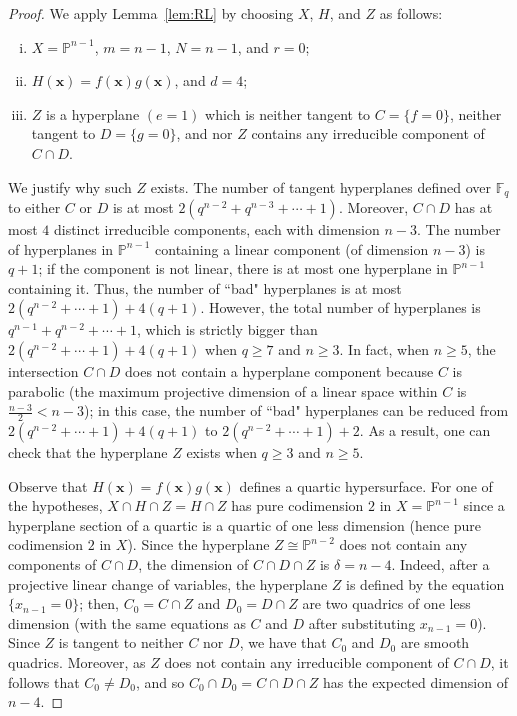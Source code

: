 \documentclass[10pt,a4paper]{amsart}
\begin{document}
\begin{proof} We apply Lemma~\ref{lem:RL} by choosing $X$, $H$, and $Z$ as follows:
\begin{enumerate}[(i)]
\item $X=\mathbb{P}^{n-1}$, $m=n-1$, $N=n-1$, and $r=0$;
\item $H(\mathbf{x})=f(\mathbf{x})g(\mathbf{x})$, and $d=4$;
\item $Z$ is a hyperplane $(e=1)$ which is neither tangent to $C=\{f=0\}$, neither tangent to $D=\{g=0\}$, and nor $Z$ contains any irreducible component of $C\cap D$. 
\end{enumerate}   
We justify why such $Z$ exists. The number of tangent hyperplanes defined over $\mathbb{F}_q$ to either $C$ or $D$ is at most $2(q^{n-2}+q^{n-3}+\cdots+1)$. Moreover, $C\cap D$ has at most $4$ distinct irreducible components, each with dimension $n-3$. The number of hyperplanes in $\mathbb{P}^{n-1}$ containing a linear component (of dimension $n-3$) is $q+1$; if the component is not linear, there is at most one hyperplane in $\mathbb{P}^{n-1}$ containing it. Thus, the number of ``bad" hyperplanes is at most $2(q^{n-2}+\cdots + 1) + 4(q+1)$. However, the total number of hyperplanes is $q^{n-1}+q^{n-2}+\cdots+1$, which is strictly bigger than $2(q^{n-2}+\cdots + 1) + 4(q+1)$ when $q\geq 7$ and $n \geq 3$. In fact, when $n\geq 5$, the intersection $C\cap D$ does not contain a hyperplane component because $C$ is parabolic (the maximum projective dimension of a linear space within $C$ is $\frac{n-3}{2}<n-3$); in this case, the number of ``bad" hyperplanes can be reduced from $2(q^{n-2}+\cdots + 1) + 4(q+1)$ to $2(q^{n-2}+\cdots + 1) + 2$. As a result, one can check that the hyperplane $Z$ exists when $q\geq 3$ and $n\geq 5$.

Observe that $H(\mathbf{x})=f(\mathbf{x})g(\mathbf{x})$ defines a quartic hypersurface. For one of the hypotheses, $X\cap H\cap Z = H\cap Z$ has pure codimension $2$ in $X=\mathbb{P}^{n-1}$ since a hyperplane section of a quartic is a quartic of one less dimension (hence pure codimension $2$ in $X$). Since the hyperplane $Z\cong\mathbb{P}^{n-2}$ does not contain any components of $C\cap D$, the dimension of $C\cap D\cap Z$ is $\delta = n-4$. Indeed, after a projective linear change of variables, the hyperplane $Z$ is defined by the equation $\{x_{n-1}=0\}$; then, $C_0 = C\cap Z$ and $D_0 = D\cap Z$ are two quadrics of one less dimension (with the same equations as $C$ and $D$ after substituting $x_{n-1}=0$). Since $Z$ is tangent to neither $C$ nor $D$, we have that $C_0$ and $D_0$ are smooth quadrics. Moreover, as $Z$ does not contain any irreducible component of $C\cap D$, it follows that $C_0\neq D_0$, and so $C_0\cap D_0 = C\cap D\cap Z$ has the expected dimension of $n-4$.


\end{proof}
\end{document}
